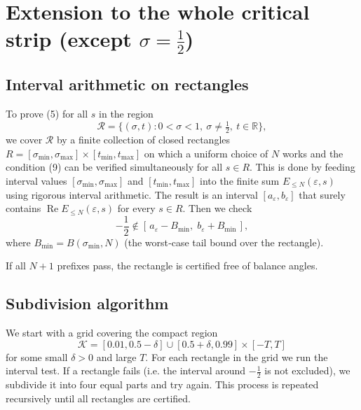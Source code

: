 \documentclass[11pt,a4paper]{article}
\theoremstyle{definition}
\theoremstyle{remark}
\begin{document}
\section{Extension to the whole critical strip (except \(\sigma=\frac12\))}

\subsection{Interval arithmetic on rectangles}
To prove (5) for all \(s\) in the region
\[
\mathcal{R} = \{(\sigma,t): 0<\sigma<1,\ \sigma\neq\tfrac12,\ t\in\mathbb{R}\},
\]
we cover \(\mathcal{R}\) by a finite collection of closed rectangles \(R = [\sigma_{\min},\sigma_{\max}]\times[t_{\min},t_{\max}]\) on which a uniform choice of \(N\) works and the condition (9) can be verified simultaneously for all \(s\in R\).  This is done by feeding interval values \([\sigma_{\min},\sigma_{\max}]\) and \([t_{\min},t_{\max}]\) into the finite sum \(E_{\le N}(\varepsilon,s)\) using rigorous interval arithmetic.  The result is an interval \([a_\varepsilon, b_\varepsilon]\) that surely contains \(\operatorname{Re}E_{\le N}(\varepsilon,s)\) for every \(s\in R\).  Then we check
\[
-\frac12 \notin [\,a_\varepsilon - B_{\min},\; b_\varepsilon + B_{\min}\,],
\tag{10}
\]
where \(B_{\min} = B(\sigma_{\min}, N)\) (the worst‑case tail bound over the rectangle).

If all \(N+1\) prefixes pass, the rectangle is certified free of balance angles.

\subsection{Subdivision algorithm}
We start with a grid covering the compact region
\[
\mathcal{K} = [0.01, 0.5-\delta]\cup[0.5+\delta, 0.99] \times [-T, T]
\]
for some small \(\delta>0\) and large \(T\).  For each rectangle in the grid we run the interval test.  If a rectangle fails (i.e. the interval around \(-\frac12\) is not excluded), we subdivide it into four equal parts and try again.  This process is repeated recursively until all rectangles are certified.
\end{document}
